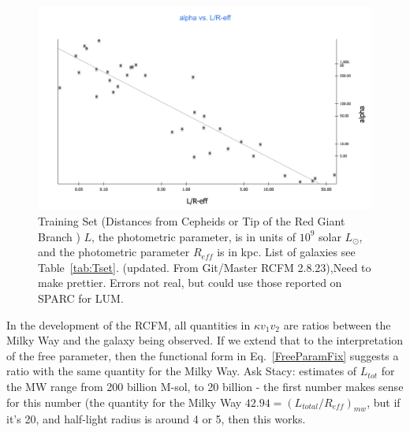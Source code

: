 \documentclass[reprint,%
 amsmath,amssymb,
 aps,
]{revtex4-1}
\begin{document}
 \begin{figure}
\includegraphics[width=\linewidth]{figures/alphavL_Reff2_8_23.png} 
\caption{  Training Set (Distances from Cepheids or Tip of the Red Giant Branch )  $L$, the  photometric parameter, is  in units of $10^9$ solar  $L_\odot$,  and the  photometric parameter $R_{eff}$ is  in kpc. List of galaxies see  Table~\ref{tab:Tset}.  {\color{blue}(updated. From Git/Master RCFM 2.8.23),Need to make prettier.  Errors not real, but could use those reported on SPARC for LUM}.  }
\label{alpha2}
\end{figure}  
 
In the development of the RCFM, all quantities in $\kappa v_1 v_2$ are ratios between  the Milky Way and the galaxy being observed. If we extend that to the interpretation of the free parameter, then 
the functional form in Eq.~\ref{FreeParamFix}   suggests a ratio with the same quantity for the Milky Way. {\color{blue} Ask Stacy: estimates of $L_{tot}$ for the MW range from 200 billion M-sol, to 20 billion - the first number makes sense for this number (the quantity for the Milky Way  $42.94 =(L_{total}/R_{eff})_{mw} $, but if it's 20, and half-light radius is around 4 or 5, then this works}. 
  

 
\end{document}
